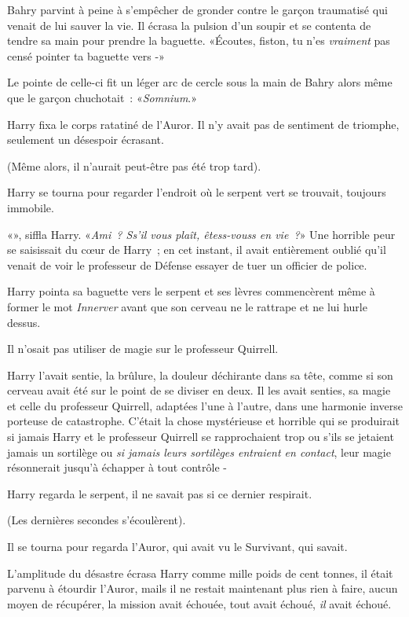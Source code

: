 Bahry parvint à peine à s'empêcher de gronder contre le garçon traumatisé qui venait de lui sauver la vie. Il écrasa la pulsion d'un soupir et se contenta de tendre sa main pour prendre la baguette. «Écoutes, fiston, tu n'es \emph{vraiment} pas censé pointer ta baguette vers -»

Le pointe de celle-ci fit un léger arc de cercle sous la main de Bahry alors même que le garçon chuchotait~: «\emph{Somnium}.»

\later

Harry fixa le corps ratatiné de l'Auror. Il n'y avait pas de sentiment de triomphe, seulement un désespoir écrasant.

(Même alors, il n'aurait peut-être pas été trop tard).

Harry se tourna pour regarder l'endroit où le serpent vert se trouvait, toujours immobile.

«», siffla Harry. «\emph{Ami~? Ss'il vous plaît, êtess-vouss en vie~?}» Une horrible peur se saisissait du cœur de Harry~; en cet instant, il avait entièrement oublié qu'il venait de voir le professeur de Défense essayer de tuer un officier de police.

Harry pointa sa baguette vers le serpent et ses lèvres commencèrent même à former le mot \emph{Innerver} avant que son cerveau ne le rattrape et ne lui hurle dessus.

Il n'osait pas utiliser de magie sur le professeur Quirrell.

Harry l'avait sentie, la brûlure, la douleur déchirante dans sa tête, comme si son cerveau avait été sur le point de se diviser en deux. Il les avait senties, sa magie et celle du professeur Quirrell, adaptées l'une à l'autre, dans une harmonie inverse porteuse de catastrophe. C'était la chose mystérieuse et horrible qui se produirait si jamais Harry et le professeur Quirrell se rapprochaient trop ou s'ils se jetaient jamais un sortilège ou \emph{si jamais leurs sortilèges entraient en contact}, leur magie résonnerait jusqu'à échapper à tout contrôle -

Harry regarda le serpent, il ne savait pas si ce dernier respirait.

(Les dernières secondes s'écoulèrent).

Il se tourna pour regarda l'Auror, qui avait vu le Survivant, qui savait.

L'amplitude du désastre écrasa Harry comme mille poids de cent tonnes, il était parvenu à étourdir l'Auror, mails il ne restait maintenant plus rien à faire, aucun moyen de récupérer, la mission avait échouée, tout avait échoué, \emph{il} avait échoué.

